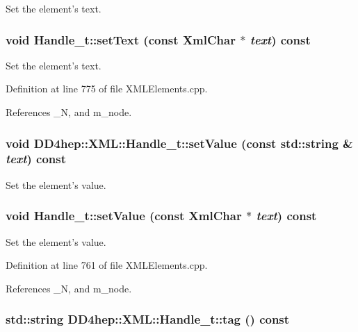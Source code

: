 Set the element's text. \hypertarget{class_d_d4hep_1_1_x_m_l_1_1_handle__t_a51f2f7fef3796fe3a1eab5a69c9d0c48}{
\subsubsection[{setText}]{\setlength{\rightskip}{0pt plus 5cm}void Handle\_\-t::setText (const {\bf XmlChar} $\ast$ {\em text}) const}}
\label{class_d_d4hep_1_1_x_m_l_1_1_handle__t_a51f2f7fef3796fe3a1eab5a69c9d0c48}


Set the element's text. 

Definition at line 775 of file XMLElements.cpp.

References \_\-N, and m\_\-node.\hypertarget{class_d_d4hep_1_1_x_m_l_1_1_handle__t_adbb7796780b972513d5b75df704807c0}{
\subsubsection[{setValue}]{\setlength{\rightskip}{0pt plus 5cm}void DD4hep::XML::Handle\_\-t::setValue (const std::string \& {\em text}) const}}
\label{class_d_d4hep_1_1_x_m_l_1_1_handle__t_adbb7796780b972513d5b75df704807c0}


Set the element's value. \hypertarget{class_d_d4hep_1_1_x_m_l_1_1_handle__t_aa04db3e02912d490c9eeef20df7c57b8}{
\subsubsection[{setValue}]{\setlength{\rightskip}{0pt plus 5cm}void Handle\_\-t::setValue (const {\bf XmlChar} $\ast$ {\em text}) const}}
\label{class_d_d4hep_1_1_x_m_l_1_1_handle__t_aa04db3e02912d490c9eeef20df7c57b8}


Set the element's value. 

Definition at line 761 of file XMLElements.cpp.

References \_\-N, and m\_\-node.\hypertarget{class_d_d4hep_1_1_x_m_l_1_1_handle__t_a8d7c8b63a04958e0a492afe0ac69c8b6}{
\subsubsection[{tag}]{\setlength{\rightskip}{0pt plus 5cm}std::string DD4hep::XML::Handle\_\-t::tag () const}}
\label{class_d_d4hep_1_1_x_m_l_1_1_handle__t_a8d7c8b63a04958e0a492afe0ac69c8b6}


